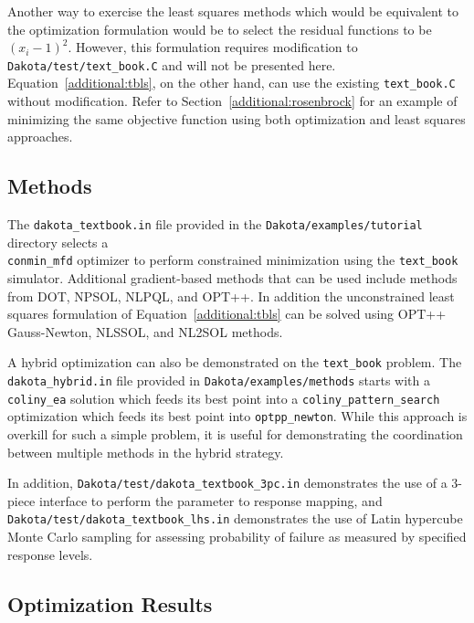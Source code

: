 Another way to exercise the least squares methods which would be
equivalent to the optimization formulation would be to select the
residual functions to be $(x_{i}-1)^2$. However, this formulation
requires modification to \texttt{Dakota/test/text\_book.C} and will
not be presented here. Equation~\ref{additional:tbls}, on the other
hand, can use the existing \texttt{text\_book.C} without modification.
Refer to Section~\ref{additional:rosenbrock} for an example of
minimizing the same objective function using both optimization and
least squares approaches.

\subsection{Methods}\label{additional:textbook:methods}

The \texttt{dakota\_textbook.in} file provided in the
\texttt{Dakota/examples/tutorial} directory selects a \\
\texttt{conmin\_mfd}
optimizer to perform constrained minimization using
the \texttt{text\_book} simulator.  Additional gradient-based methods
that can be used include methods from 
DOT, 
NPSOL, NLPQL, and OPT++.
In addition the unconstrained least squares formulation of
Equation~\ref{additional:tbls} can be solved using OPT++ Gauss-Newton,
NLSSOL, and NL2SOL methods.

A hybrid optimization can also be demonstrated on the
\texttt{text\_book} problem. The \texttt{dakota\_hybrid.in} file
provided in {\tt Dakota/examples/methods} starts with a
\texttt{coliny\_ea} solution which feeds its best point into a
\texttt{coliny\_pattern\_search} optimization which feeds its best
point into \texttt{optpp\_newton}. While this approach is overkill for
such a simple problem, it is useful for demonstrating the coordination
between multiple methods in the hybrid strategy.

In addition, \texttt{Dakota/test/dakota\_textbook\_3pc.in}
demonstrates the use of a 3-piece interface to perform the parameter
to response mapping, and \texttt{Dakota/test/dakota\_textbook\_lhs.in}
demonstrates the use of Latin hypercube Monte Carlo sampling for
assessing probability of failure as measured by specified response
levels.

\subsection{Optimization Results}\label{additional:textbook:results}

